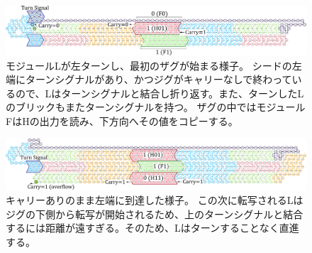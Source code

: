\documentclass[a4,11pt]{article}
\begin{document}
\begin{figure}[h]
\centering
\includegraphics[width=\linewidth]{fig/svg/CounterEx11_1.pdf}
\caption{
モジュールLが左ターンし、最初のザグが始まる様子。
シードの左端にターンシグナルがあり、かつジグがキャリーなしで終わっているので、Lはターンシグナルと結合し折り返す。また、ターンしたLのブリックもまたターンシグナルを持つ。
ザグの中ではモジュールFはHの出力を読み、下方向へその値をコピーする。
}
\label{fig:counter1stzag}
\end{figure}

\begin{figure}[h]
\centering
\includegraphics[width=\linewidth]{fig/svg/CounterEx13_1.pdf}
\caption{
キャリーありのまま左端に到達した様子。
この次に転写されるLはジグの下側から転写が開始されるため、上のターンシグナルと結合するには距離が遠すぎる。そのため、Lはターンすることなく直進する。
}
\label{fig:overflowex1}
\end{figure}
%
%
%
%
%
%
\end{document}
